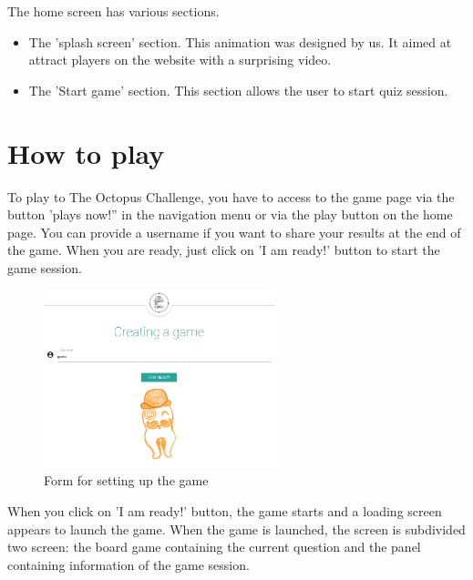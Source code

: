 \documentclass[a4paper,11pt, oneside]{book}
\def\appName{The Octopus Challenge}
\def\octopusName{Lord Octopus}
\begin{document}
The home screen has various sections.
\begin{itemize}
	\item The 'splash screen' section. This animation was designed by us. It aimed at attract players on the website with a surprising video.
	\item The 'Start game' section. This section allows the user to start quiz session.
\end{itemize}


	\section{How to play}

To play to \appName, you have to access to the game page via the button 'plays now!'' in the navigation menu or via the play button on the home page.
You can provide a username if you want to share your results at the end of the game.
When you are ready, just click on 'I am ready!' button to start the game session.

\begin{figure} [htbp]
	\centering
	\includegraphics[width=0.6\textwidth]{CCreate.png}
	\caption{Form for setting up the game}
\end{figure}

\noindent When you click on 'I am ready!' button, the game starts and a loading screen appears to launch the game.
When the game is launched, the screen is subdivided two screen: the board game containing the current question and the panel containing information of the game session.
\end{document}

